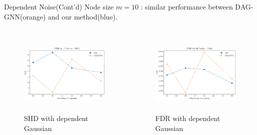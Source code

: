 \documentclass{beamer}
\begin{document}
\begin{frame}{Dependent Noise(Cont'd)}
    Node size $m=10$ : similar performance between DAG-GNN(orange) and our method(blue).
    \begin{columns}
        \begin{column}{0.5\textwidth}
            \begin{figure}
                \centering
                \includegraphics[height=4cm]{fig/SHD_dependence_10_DAG_threshold0.3.pdf}
                \caption{SHD with dependent Gaussian}
                \label{fig:dep_gaussian_shd_10}
            \end{figure}
        \end{column}
        \begin{column}{0.5\textwidth}
            \begin{figure}
                \centering
                \includegraphics[height=4cm]{fig/FDR_dependence_10_DAG_threshold0.3.pdf}
                \caption{FDR with dependent Gaussian}
                \label{fig:dep_gaussian_fdr_10}
            \end{figure}
        \end{column}
    \end{columns}
\end{frame}
\end{document}
